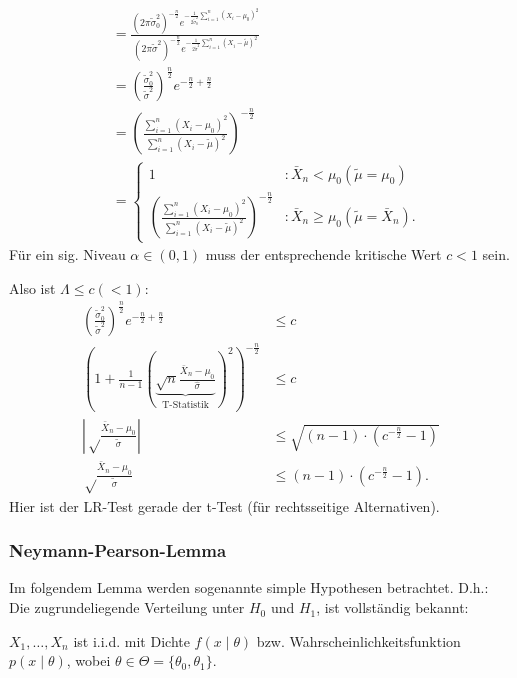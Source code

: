 \documentclass[10pt]{article}
\newcommand{\FZV}{X_1, \ldots, X_n} %
\newcommand{\sni}{\sum_{i=1}^{n}} %
\newenvironment{BSP}[1][]
{\begin{Beispiel}[frametitle=#1]}{\end{Beispiel}}
\begin{document}
\begin{BSP}[Beispiel 2.1.4 (t-Test mit einseitiger Alternative)]
\begin{equation*}
\begin{split}
			&= \frac{(2 \pi \tilde{\sigma}^2_0)^{-\frac{n}{2}} e^{-\frac{1}{2 \tilde{\sigma}^2_0} \sni (X_i - \mu_0)^2}}{(2 \pi \tilde{\sigma}^2)^{-\frac{n}{2}} e^{-\frac{1}{2 \tilde{\sigma}^2} \sni (X_i - \tilde{\mu})^2}}\\
			&= \left(\frac{\tilde{\sigma}^2_0}{\tilde{\sigma}^2}\right)^{\frac{n}{2}} e^{-\frac{n}{2}+\frac{n}{2}}\\
			&=\left(\frac{\sni (X_i - \mu_0)^2}{\sni (X_i - \tilde{\mu})^2}\right)^{-\frac{n}{2}}\\
			&= \begin{cases}
				1 &: \bar{X}_n < \mu_0 (\tilde{\mu} = \mu_0)\\
				\left(\frac{\sni (X_i - \mu_0)^2}{\sni (X_i - \tilde{\mu})^2}\right)^{-\frac{n}{2}} &: \bar{X}_n \geq \mu_0 (\tilde{\mu} = \bar{X}_n).
			\end{cases}
		\end{split}
	\end{equation*}
	Für ein sig. Niveau $\alpha \in (0,1)$ muss der entsprechende kritische Wert $c < 1$ sein. 
	
	Also ist $\Lambda \leq c (< 1)$:
	\begin{equation*}
		\begin{split}
			\left(\frac{\tilde{\sigma}^2_0}{\tilde{\sigma}^2}\right)^{\frac{n}{2}} e^{-\frac{n}{2}+\frac{n}{2}} &\leq c\\
			\left(1 + \frac{1}{n-1} \left( \underbrace{ \sqrt{n} \frac{\bar{X}_n - \mu_0}{\hat{\sigma}}}_{\text{T-Statistik}}\right)^2\right)^{-\frac{n}{2}} & \leq c\\
			\left\vert \sqrt \frac{\bar{X}_n - \mu_0}{\tilde{\sigma}} \right\vert &\leq \sqrt{(n-1)\cdot(c^{-\frac{n}{2}} -1)}\\
			\sqrt \frac{\bar{X}_n - \mu_0}{\tilde{\sigma}} &\leq (n-1)\cdot(c^{-\frac{n}{2}} -1).
		\end{split}
	\end{equation*}
	Hier ist der LR-Test gerade der t-Test (für rechtsseitige Alternativen).
	\end{BSP}
	
	\subsubsection{Neymann-Pearson-Lemma}
	
	Im folgendem Lemma werden sogenannte simple Hypothesen betrachtet. D.h.: Die zugrundeliegende Verteilung unter $H_0$ und $H_1$, ist vollständig bekannt:
	
	$\FZV$ ist i.i.d. mit Dichte $f(x\mid \theta)$ bzw. Wahrscheinlichkeitsfunktion $p(x\mid \theta)$, wobei $\theta \in \Theta = \{\theta_0, \theta_1\}$. 
	
\end{document}
